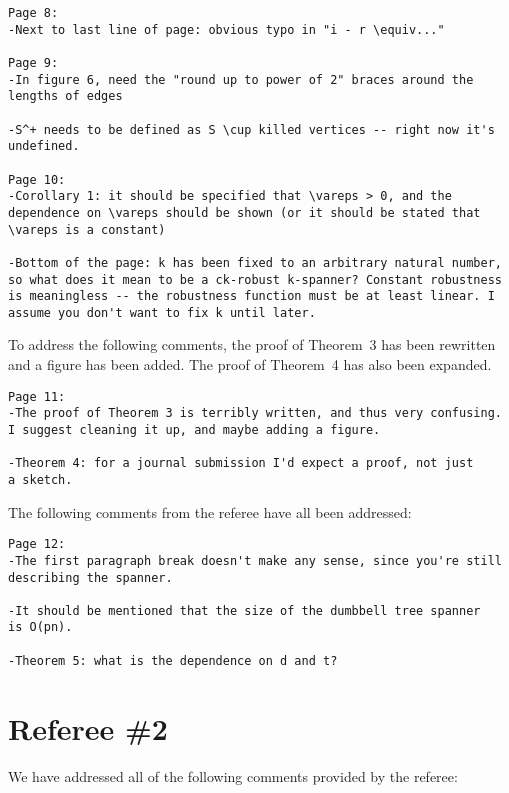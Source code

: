 \documentclass{patmorin}
\begin{document}
\begin{Verbatim}[frame=single]
Page 8:
-Next to last line of page: obvious typo in "i - r \equiv..."

Page 9:
-In figure 6, need the "round up to power of 2" braces around the
lengths of edges

-S^+ needs to be defined as S \cup killed vertices -- right now it's
undefined.

Page 10:
-Corollary 1: it should be specified that \vareps > 0, and the
dependence on \vareps should be shown (or it should be stated that
\vareps is a constant)

-Bottom of the page: k has been fixed to an arbitrary natural number,
so what does it mean to be a ck-robust k-spanner? Constant robustness
is meaningless -- the robustness function must be at least linear. I
assume you don't want to fix k until later.
\end{Verbatim}

To address the following comments, the proof of Theorem~3 has been
rewritten and a figure has been added.  The proof of Theorem~4 has also
been expanded.
\begin{Verbatim}[frame=single]
Page 11:
-The proof of Theorem 3 is terribly written, and thus very confusing.
I suggest cleaning it up, and maybe adding a figure.

-Theorem 4: for a journal submission I'd expect a proof, not just
a sketch.
\end{Verbatim}

The following comments from the referee have all been addressed:

\begin{Verbatim}[frame=single]
Page 12:
-The first paragraph break doesn't make any sense, since you're still
describing the spanner.

-It should be mentioned that the size of the dumbbell tree spanner
is O(pn).

-Theorem 5: what is the dependence on d and t?
\end{Verbatim}

\section{Referee \#2}

We have addressed all of the following comments provided by the referee:
\end{document}
